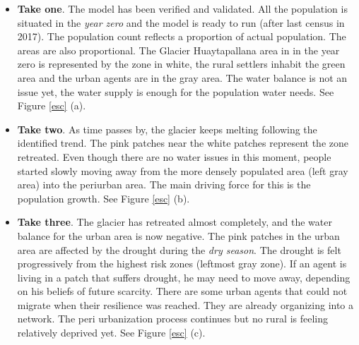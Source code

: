 \documentclass[doc,12pt,floatsintext]{apa7}
\begin{document}
\begin{itemize}
\item {\bf Take one}. The model has been verified and validated. All the population is situated in the \emph{year zero} and the model is ready to run (after last census in 2017). The population count reflects a proportion of actual population. The areas are also proportional. The Glacier Huaytapallana area in in the year zero is represented by the zone in white, the rural settlers inhabit the green area and the urban agents are in the gray area. The water balance is not an issue yet, the water supply is enough for the population water needs. See Figure \ref{esc} (a).


\item {\bf Take two}. As time passes by, the glacier keeps melting following the identified trend. The pink patches near the white patches represent the zone retreated. Even though there are no water issues in this moment, people started slowly moving away from the more densely populated area (left gray area) into the periurban area. The main driving force for this is the population growth. See Figure \ref{esc} (b).


\item {\bf Take three}. The glacier has retreated almost completely, and the water balance for the urban area is now negative. The pink patches in the urban area are affected by the drought during the \emph{dry season}. The drought is felt progressively from the highest risk zones (leftmost gray zone).  If an agent is living in a patch that suffers drought, he may need to move away, depending on his beliefs of future scarcity. There are some urban agents that could not migrate when their resilience was reached. They are already organizing into a network. The peri urbanization process continues but no rural is feeling relatively deprived yet. See Figure \ref{esc} (c).


\end{itemize}
\end{document}
